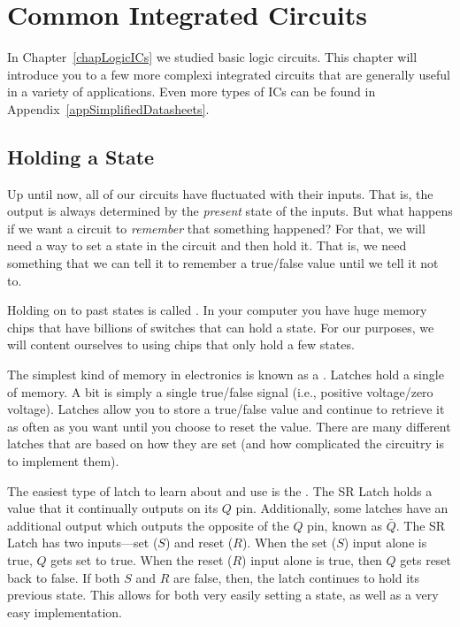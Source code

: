 \chapter{Common Integrated Circuits}

In Chapter~\ref{chapLogicICs} we studied basic logic circuits.
This chapter will introduce you to a few more complexi integrated circuits that are generally useful in a variety of applications.
Even more types of ICs can be found in Appendix~\ref{appSimplifiedDatasheets}.

\section{Holding a State}

Up until now, all of our circuits have fluctuated with their inputs. 
That is, the output is always determined by the \emph{present} state of the inputs.
But what happens if we want a circuit to \emph{remember} that something happened?
For that, we will need a way to set a state in the circuit and then hold it.
That is, we need something that we can tell it to remember a true/false value until we tell it not to.

Holding on to past states is called .
In your computer you have huge memory chips that have billions of switches that can hold a state.
For our purposes, we will content ourselves to using chips that only hold a few states.

The simplest kind of memory in electronics is known as a .
Latches hold a single  of memory.
A bit is simply a single true/false signal (i.e., positive voltage/zero voltage).
Latches allow you to store a true/false value and continue to retrieve it as often as you want until you choose to reset the value.
There are many different latches that are based on how they are set (and how complicated the circuitry is to implement them).

The easiest type of latch to learn about and use is the .
The SR Latch holds a value that it continually outputs on its $Q$ pin.
Additionally, some latches have an additional output which outputs the opposite of the $Q$ pin, known as $\bar{Q}$.
The SR Latch has two inputs---set ($S$) and reset ($R$).  
When the set ($S$) input alone is true, $Q$ gets set to true.
When the reset ($R$) input alone is true, then $Q$ gets reset back to false.
If both $S$ and $R$ are false, then, the latch continues to hold its previous state.
This allows for both very easily setting a state, as well as a very easy implementation.


